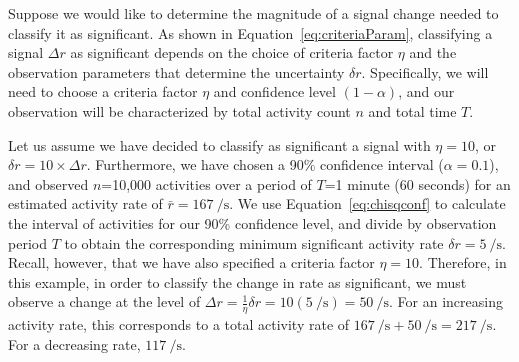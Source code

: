 \documentclass{article}
\begin{document}
Suppose we would like to determine the magnitude of a signal change needed to 
classify it as significant. As shown in Equation~\ref{eq:criteriaParam}, 
classifying a signal $\Delta r$ as significant depends on the choice of criteria factor 
$\eta$ and the observation parameters that determine the uncertainty $\delta r$. 
Specifically, we will need to choose a criteria factor $\eta$ and confidence level 
$(1-\alpha)$, and our observation will be characterized by total activity count $n$ 
and total time $T$.

Let us assume we have decided to classify as significant a signal with $\eta = 10$, or 
$\delta r = 10\times\Delta r$. Furthermore, we have chosen a 90\% confidence interval 
($\alpha = 0.1$), and observed $n$=10,000 activities over a period of $T$=1 minute 
(60 seconds) for an estimated activity rate of $\bar r = 167~\si{\per\second}$. We use 
Equation~\ref{eq:chisqconf} to calculate the interval of activities for our 
90\% confidence level, and divide by observation period $T$ to obtain the corresponding 
minimum significant activity rate $\delta r = 5~\si{\per\second}$. Recall, however, 
that we have also specified a criteria factor $\eta = 10$. Therefore, in this example, 
in order to classify the change in rate as significant, we must observe a change at the 
level of $\Delta r =\frac{1}{\eta} \delta r = 10 (5~\si{\per\second}) = 50~\si{\per\second}$. 
For an increasing activity rate, this corresponds to a total activity rate of 
$167~\si{\per\second} + 50~\si{\per\second} = 217~\si{\per\second}$. For a decreasing 
rate, $117~\si{\per\second}$.




\end{document}
